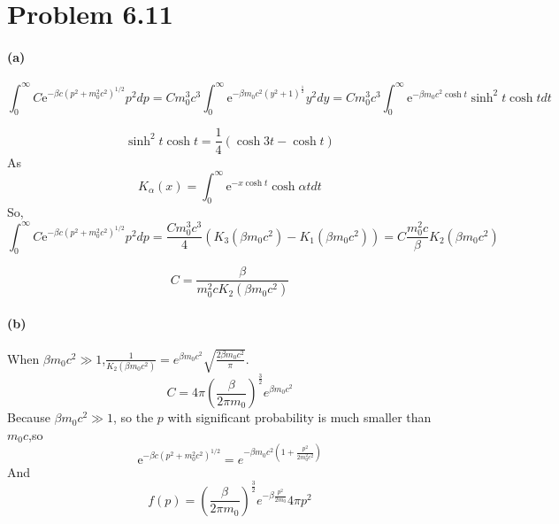\documentclass{article}
\begin{document}
\section*{Problem 6.11}
\paragraph*{(a)}
\begin{equation}
\int_{0}^{\infty} C \mathrm{e}^{-\beta c (p^2+m_0^2c^2)^{1/2}} p^2 dp = Cm_0^3c^3 \int_0^{\infty} \mathrm{e}^{-\beta m_0c^2 (y^2+1)^{\frac{1}{2}}} y^2 dy = Cm_0^3c^3 \int_0^{\infty} \mathrm{e}^{-\beta m_0c^2 \cosh t} \sinh^2t \cosh t dt
\end{equation}

\begin{equation}
\sinh^2 t \cosh t = \frac{1}{4} (\cosh 3t -\cosh t)
\end{equation}
As
\begin{equation}
K_{\alpha}(x)= \int_0^{\infty} \mathrm{e}^{-x\cosh t} \cosh \alpha t dt  
\end{equation}
So,
\begin{equation}
\int_{0}^{\infty} C \mathrm{e}^{-\beta c (p^2+m_0^2c^2)^{1/2}} p^2 dp = \frac{Cm_0^3c^3}{4} (K_3(\beta m_0c^2)-K_1(\beta m_0c^2)) = C \frac{m_0^2 c}{\beta} K_2(\beta m_0 c^2)
\end{equation}

\begin{equation}
C=\frac{\beta}{m_0^2 c K_2(\beta m_0 c^2)}
\end{equation}


\paragraph*{(b)}
When $\beta m_0c^2 \gg 1$,$\frac{1}{K_2(\beta m_0c^2)}=e^{\beta m_0c^2} \sqrt{\frac{2\beta m_0c^2}{\pi}}$.
\begin{equation}
C=4\pi (\frac{\beta}{2\pi m_0})^{\frac{3}{2}}e^{\beta m_0c^2}
\end{equation}
Because $\beta m_0 c^2 \gg 1$, so the $p$ with significant probability is much smaller than $m_0c$,so
\begin{equation}
\mathrm{e}^{-\beta c (p^2+m_0^2c^2)^{1/2}} = e^{-\beta m_0c^2(1+\frac{p^2}{2m_0^2c^2})}
\end{equation}
And
\begin{equation}
f(p) = (\frac{\beta}{2\pi m_0})^{\frac{3}{2}} e^{-\beta \frac{p^2}{2m_0}} 4\pi p^2
\end{equation}
\end{document}
